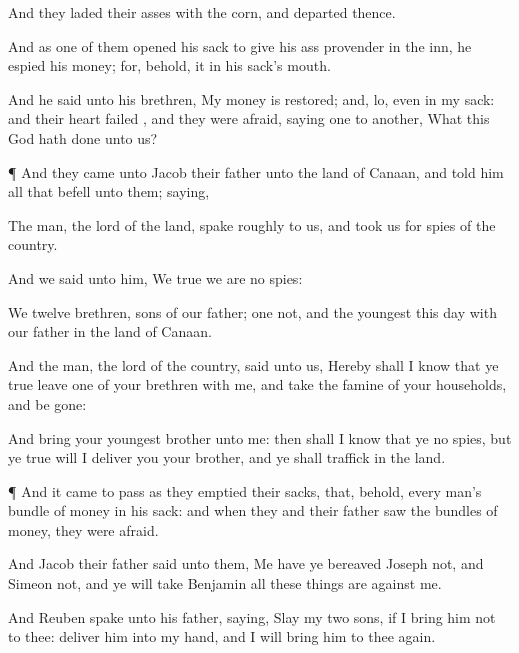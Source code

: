 {And they
laded their
asses with the
corn, and
departed thence.

And as
one of them
opened his
sack to
give his
ass
provender in the
inn, he
espied his
money; for, behold, it
{} in his
sack’s
mouth.

And he
said unto his
brethren, My
money is
restored; and,
lo,
{} even in my
sack: and their
heart
failed
{}, and they were
afraid,
saying
one to
another, What
{} this
{}
God hath
done unto us?


\par }{\PP {}¶ And they
came unto
Jacob their
father unto the
land of
Canaan, and
told him all that
befell unto them;
saying,

The
man,
{} the
lord of the
land,
spake
roughly to us, and
took us for
spies of the
country.

And we
said unto him, We
{}
true
{} we are no
spies:

We
{}
twelve
brethren,
sons of our
father;
one
{} not, and the
youngest
{} this
day with our
father in the
land of
Canaan.

And the
man, the
lord of the
country,
said unto us, Hereby shall I
know that ye
{}
true
{}
leave
one of your
brethren
{} with me, and
take
{} the
famine of your
households, and be
gone:

And
bring your
youngest
brother unto me: then shall I
know that ye
{} no
spies, but
{} ye
{}
true
{} will I
deliver you your
brother, and ye shall
traffick in the
land.


\par }{\PP {}¶ And it came to pass as they
emptied their
sacks, that, behold, every
man’s
bundle of
money
{} in his
sack: and when
{} they and their
father
saw the
bundles of
money, they were
afraid.

And
Jacob their
father
said unto them, Me have ye
bereaved
{}
Joseph
{} not, and
Simeon
{} not, and ye will
take
Benjamin
{} all these things are against me.

And
Reuben
spake unto his
father,
saying,
Slay my
two
sons, if I
bring him not to thee:
deliver him into my
hand, and I will bring him to thee
again.

}
